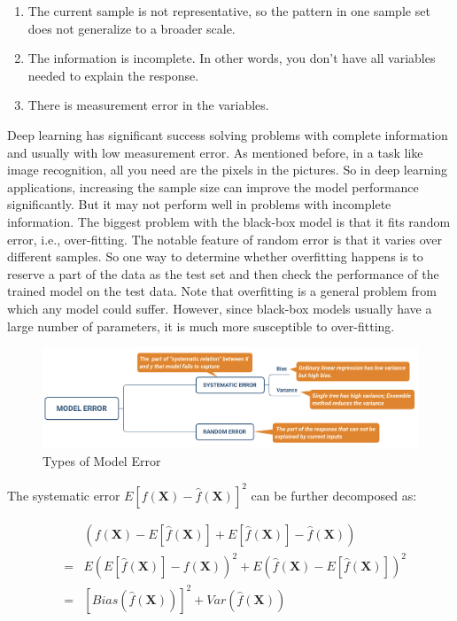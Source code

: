 \documentclass[
  12pt,
]{krantz}
\providecommand{\tightlist}{%
  \setlength{\itemsep}{0pt}\setlength{\parskip}{0pt}}
\begin{document}
\begin{enumerate}
\def\labelenumi{\arabic{enumi}.}
\tightlist
\item
  The current sample is not representative, so the pattern in one sample set does not generalize to a broader scale.
\item
  The information is incomplete. In other words, you don't have all variables needed to explain the response.
\item
  There is measurement error in the variables.
\end{enumerate}

Deep learning has significant success solving problems with complete information and usually with low measurement error. As mentioned before, in a task like image recognition, all you need are the pixels in the pictures. So in deep learning applications, increasing the sample size can improve the model performance significantly. But it may not perform well in problems with incomplete information. The biggest problem with the black-box model is that it fits random error, i.e., over-fitting. The notable feature of random error is that it varies over different samples. So one way to determine whether overfitting happens is to reserve a part of the data as the test set and then check the performance of the trained model on the test data. Note that overfitting is a general problem from which any model could suffer. However, since black-box models usually have a large number of parameters, it is much more susceptible to over-fitting.

\begin{figure}
\centering
\includegraphics{images/ModelError.png}
\caption{Types of Model Error}
\end{figure}

The systematic error \(E[f(\mathbf{X})-\hat{f}(\mathbf{X})]^{2}\) can be further decomposed as:

\begin{equation}
\begin{array}{ccc}
 &  & \left(f(\mathbf{X})-E[\hat{f}(\mathbf{X})]+E[\hat{f}(\mathbf{X})]-\hat{f}(\mathbf{X})\right)\\
 & = & E\left(E[\hat{f}(\mathbf{X})]-f(\mathbf{X})\right)^{2}+E\left(\hat{f}(\mathbf{X})-E[\hat{f}(\mathbf{X})]\right)^{2}\\
 & = & [Bias(\hat{f}(\mathbf{X}))]^{2}+Var(\hat{f}(\mathbf{X}))
\end{array}
\label{eq:biasvariance}
\end{equation}
\end{document}
